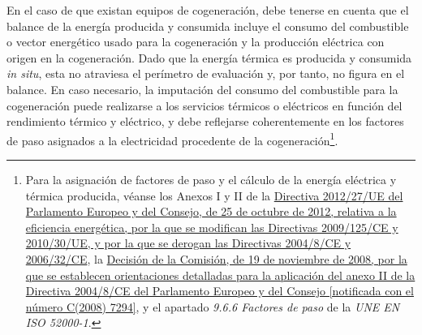 \documentclass[10pt,notitlepage,oneside,a4paper]{article}
\begin{document}
En el caso de que existan equipos de cogeneración, debe tenerse en cuenta que el balance de la energía producida y consumida incluye el consumo del combustible o vector energético usado para la cogeneración y la producción eléctrica con origen en la cogeneración. Dado que la energía térmica es producida y consumida \textit{in situ}, esta no atraviesa el perímetro de evaluación y, por tanto, no figura en el balance. En caso necesario, la imputación del consumo del combustible para la cogeneración puede realizarse a los servicios térmicos o eléctricos en función del rendimiento térmico y eléctrico, y debe reflejarse coherentemente en los factores de paso asignados a la electricidad procedente de la cogeneración\footnote{Para la asignación de factores de paso y el cálculo de la energía eléctrica y térmica producida, véanse los Anexos I y II de la \href{https://www.boe.es/buscar/doc.php?id=DOUE-L-2012-82191}{Directiva 2012/27/UE del Parlamento Europeo y del Consejo, de 25 de octubre de 2012, relativa a la eficiencia energética, por la que se modifican las Directivas 2009/125/CE y 2010/30/UE, y por la que se derogan las Directivas 2004/8/CE y 2006/32/CE}, la \href{https://www.boe.es/buscar/doc.php?id=DOUE-L-2008-82509}{Decisión de la Comisión, de 19 de noviembre de 2008, por la que se establecen orientaciones detalladas para la aplicación del anexo II de la Directiva 2004/8/CE del Parlamento Europeo y del Consejo [notificada con el número C(2008) 7294]}, y el apartado \textit{9.6.6 Factores de paso} de la \textit{UNE EN ISO 52000-1}.}.
\end{document}

